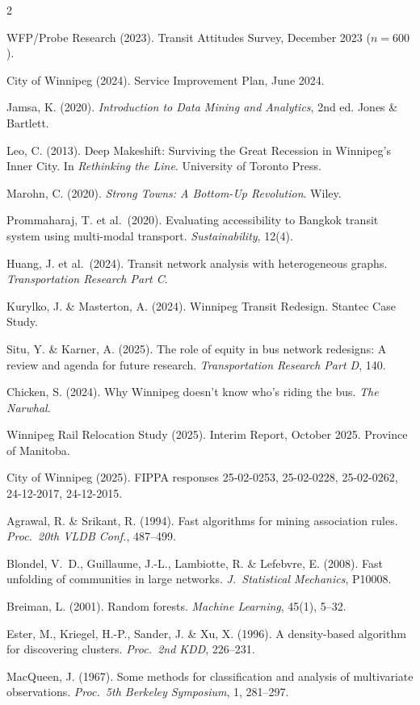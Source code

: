 \documentclass[11pt]{article}
\begin{document}
{\begin{multicols}{2}
\begin{enumerate}[label={[\arabic*]}]
\item WFP/Probe Research (2023). Transit Attitudes Survey, December 2023 ($n=600$).
\item City of Winnipeg (2024). Service Improvement Plan, June 2024.
\item Jamsa, K. (2020). \emph{Introduction to Data Mining and Analytics}, 2nd ed. Jones \& Bartlett.
\item Leo, C. (2013). Deep Makeshift: Surviving the Great Recession in Winnipeg's Inner City. In \emph{Rethinking the Line}. University of Toronto Press.
\item Marohn, C. (2020). \emph{Strong Towns: A Bottom-Up Revolution}. Wiley.
\item Prommaharaj, T. et al.\ (2020). Evaluating accessibility to Bangkok transit system using multi-modal transport. \emph{Sustainability}, 12(4).
\item Huang, J. et al.\ (2024). Transit network analysis with heterogeneous graphs. \emph{Transportation Research Part C}.
\item Kurylko, J. \& Masterton, A. (2024). Winnipeg Transit Redesign. Stantec Case Study.
\item Situ, Y. \& Karner, A. (2025). The role of equity in bus network redesigns: A review and agenda for future research. \emph{Transportation Research Part D}, 140.
\item Chicken, S. (2024). Why Winnipeg doesn't know who's riding the bus. \emph{The Narwhal}.
\item Winnipeg Rail Relocation Study (2025). Interim Report, October 2025. Province of Manitoba.
\item City of Winnipeg (2025). FIPPA responses 25-02-0253, 25-02-0228, 25-02-0262, 24-12-2017, 24-12-2015.
\item Agrawal, R. \& Srikant, R. (1994). Fast algorithms for mining association rules. \emph{Proc.\ 20th VLDB Conf.}, 487--499.
\item Blondel, V.~D., Guillaume, J.-L., Lambiotte, R. \& Lefebvre, E. (2008). Fast unfolding of communities in large networks. \emph{J.~Statistical Mechanics}, P10008.
\item Breiman, L. (2001). Random forests. \emph{Machine Learning}, 45(1), 5--32.
\item Ester, M., Kriegel, H.-P., Sander, J. \& Xu, X. (1996). A density-based algorithm for discovering clusters. \emph{Proc.~2nd KDD}, 226--231.
\item MacQueen, J. (1967). Some methods for classification and analysis of multivariate observations. \emph{Proc.~5th Berkeley Symposium}, 1, 281--297.

\end{enumerate}
\end{multicols}}
\end{document}
